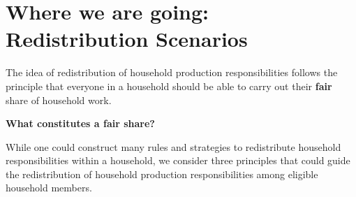 \documentclass[
  11pt,
]{article}
\begin{document}
\begin{table}

\caption{\label{tbl-stat}Summary Statistics Population}


\end{table}%

\section{Where we are going: Redistribution
Scenarios}\label{where-we-are-going-redistribution-scenarios}

The idea of redistribution of household production responsibilities
follows the principle that everyone in a household should be able to
carry out their \textbf{fair} share of household work.

\textbf{What constitutes a fair share?}

While one could construct many rules and strategies to redistribute
household responsibilities within a household, we consider three
principles that could guide the redistribution of household production
responsibilities among eligible household members.
\end{document}
